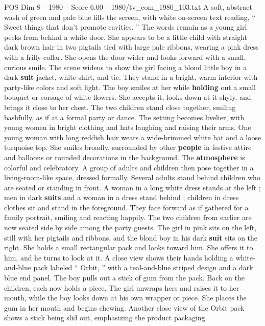 \begin{textsample}{POS Dim 8 – 1980 – Score 6.00 – 1980/tv\_com\_1980\_103.txt}  \label{ex:f8_pos_047}
A soft, abstract wash of green and pale blue fills the screen, with white on-screen text reading, “ Sweet things that don't promote cavities. ” The words remain as a young girl peeks from behind a white door.
She appears to be a little child with straight dark brown hair in two pigtails tied with large pale ribbons, wearing a pink dress with a frilly collar.
She opens the door wider and looks forward with a small, curious smile.
The scene widens to show the girl facing a blond little boy in a dark \textbf{suit} jacket, white shirt, and tie.
They stand in a bright, warm interior with party-like colors and soft light.
The boy smiles at her while \textbf{holding} out a small bouquet or corsage of white flowers.
She accepts it, looks down at it shyly, and brings it close to her chest.
The two children stand close together, smiling bashfully, as if at a formal party or dance.
The setting becomes livelier, with young women in bright clothing and hats laughing and raising their arms.
One young woman with long reddish hair wears a wide-brimmed white hat and a loose turquoise top.
She smiles broadly, surrounded by other \textbf{people} in festive attire and balloons or rounded decorations in the background.
The \textbf{atmosphere} is colorful and celebratory.
A group of adults and children then pose together in a living-room-like space, dressed formally.
Several adults stand behind children who are seated or standing in front.
A woman in a long white dress stands at the left ; men in dark \textbf{suits} and a woman in a dress stand behind ; children in dress clothes sit and stand in the foreground.
They face forward as if gathered for a family portrait, smiling and reacting happily.
The two children from earlier are now seated side by side among the party guests.
The girl in pink sits on the left, still with her pigtails and ribbons, and the blond boy in his dark \textbf{suit} sits on the right.
She holds a small rectangular pack and looks toward him.
She offers it to him, and he turns to look at it.
A close view shows their hands holding a white-and-blue pack labeled “ Orbit, ” with a teal-and-blue striped design and a dark blue end panel.
The boy pulls out a stick of gum from the pack.
Back on the children, each now holds a piece.
The girl unwraps hers and raises it to her mouth, while the boy looks down at his own wrapper or piece.
She places the gum in her mouth and begins chewing.
Another close view of the Orbit pack shows a stick being slid out, emphasizing the product packaging.

\end{textsample}
